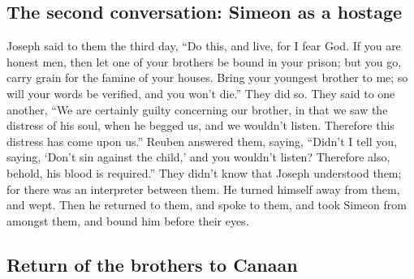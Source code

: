 \hypertarget{the-second-conversation-simeon-as-a-hostage}{%
\subsection{The second conversation: Simeon as a
hostage}\label{the-second-conversation-simeon-as-a-hostage}}

 Joseph said to them the third day, ``Do this, and live,
for I fear God.  If you are honest men, then let one of
your brothers be bound in your prison; but you go, carry grain for the
famine of your houses.  Bring your youngest brother to
me; so will your words be verified, and you won't die.'' They did so.
 They said to one another, ``We are certainly guilty
concerning our brother, in that we saw the distress of his soul, when he
begged us, and we wouldn't listen. Therefore this distress has come upon
us.''  Reuben answered them, saying, ``Didn't I tell you,
saying, `Don't sin against the child,' and you wouldn't listen?
Therefore also, behold, his blood is required.''  They
didn't know that Joseph understood them; for there was an interpreter
between them.  He turned himself away from them, and
wept. Then he returned to them, and spoke to them, and took Simeon from
amongst them, and bound him before their eyes.

\hypertarget{return-of-the-brothers-to-canaan}{%
\subsection{Return of the brothers to
Canaan}\label{return-of-the-brothers-to-canaan}}

